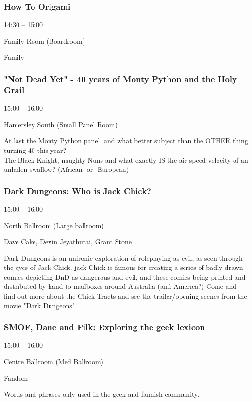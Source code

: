 \documentclass{scrreprt}
\begin{document}
\begin{multicols}{2}
\subsubsection*{How To Origami}\begin{description}
\setlength{\itemsep}{0pt}
\setlength{\parsep}{0pt}
\setlength{\parskip}{0pt}
\item[Time:]{14:30 -- 15:00}
\item[Venue:]{Family Room (Boardroom)}
\item[Tags:]{Family}\end{description}

\subsubsection*{"Not Dead Yet" - 40 years of Monty Python and the Holy Grail}\begin{description}
\setlength{\itemsep}{0pt}
\setlength{\parsep}{0pt}
\setlength{\parskip}{0pt}
\item[Time:]{15:00 -- 16:00}
\item[Venue:]{Hamersley South (Small Panel Room)}\end{description}
At last the Monty Python panel, and what better subject than the OTHER thing turning 40 this year? \\The Black Knight, naughty Nuns and what exactly IS the air-speed velocity of an unladen swallow? (African -or- European)
\subsubsection*{Dark Dungeons: Who is Jack Chick?}\begin{description}
\setlength{\itemsep}{0pt}
\setlength{\parsep}{0pt}
\setlength{\parskip}{0pt}
\item[Time:]{15:00 -- 16:00}
\item[Venue:]{North Ballroom (Large ballroom)}
\item[People:]{Dave Cake, Devin Jeyathurai, Grant Stone}\end{description}
Dark Dungeons is an unironic exploration of roleplaying as evil, as seen through the eyes of Jack Chick. jack Chick is famous for creating a series of badly drawn comics depicting DnD as dangerous and evil, and these comics being printed and distributed by hand to mailboxes around Australia (and America?) Come and find out more about the Chick Tracts and see the trailer/opening scenes from the movie "Dark Dungeons"
\subsubsection*{SMOF, Dane and Filk: Exploring the geek lexicon}\begin{description}
\setlength{\itemsep}{0pt}
\setlength{\parsep}{0pt}
\setlength{\parskip}{0pt}
\item[Time:]{15:00 -- 16:00}
\item[Venue:]{Centre Ballroom (Med Ballroom)}
\item[Tags:]{Fandom}\end{description}
Words and phrases only used in the geek and fannish community.

\end{multicols}
\end{document}
